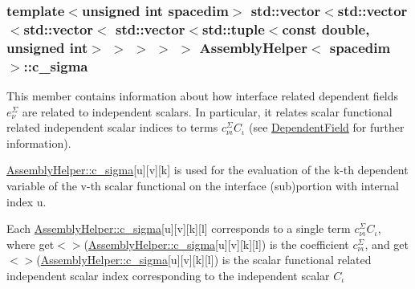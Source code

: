 \subsubsection[{\texorpdfstring{c\+\_\+sigma}{c_sigma}}]{\setlength{\rightskip}{0pt plus 5cm}template$<$unsigned int spacedim$>$ std\+::vector$<$std\+::vector$<$std\+::vector$<$ std\+::vector$<$std\+::tuple$<$const double, unsigned int$>$ $>$ $>$ $>$ $>$ {\bf Assembly\+Helper}$<$ spacedim $>$\+::c\+\_\+sigma\hspace{0.3cm}{\ttfamily [private]}}\hypertarget{class_assembly_helper_ab3d4370661ba726010ee687ef0e98140}{}\label{class_assembly_helper_ab3d4370661ba726010ee687ef0e98140}
This member contains information about how interface related dependent fields $e^\Sigma_\nu$ are related to independent scalars. In particular, it relates scalar functional related independent scalar indices to terms $c^\Sigma_{\nu\iota} C_\iota$ (see \hyperlink{class_dependent_field}{Dependent\+Field} for further information).

\hyperlink{class_assembly_helper_ab3d4370661ba726010ee687ef0e98140}{Assembly\+Helper\+::c\+\_\+sigma}\mbox{[}{\ttfamily u}\mbox{]}\mbox{[}{\ttfamily v}\mbox{]}\mbox{[}{\ttfamily k}\mbox{]} is used for the evaluation of the {\ttfamily k-\/th} dependent variable of the {\ttfamily v-\/th} scalar functional on the interface (sub)portion with internal index {\ttfamily u}.

Each \hyperlink{class_assembly_helper_ab3d4370661ba726010ee687ef0e98140}{Assembly\+Helper\+::c\+\_\+sigma}\mbox{[}{\ttfamily u}\mbox{]}\mbox{[}{\ttfamily v}\mbox{]}\mbox{[}{\ttfamily k}\mbox{]}\mbox{[}{\ttfamily l}\mbox{]} corresponds to a single term $c^\Sigma_{\nu\iota} C_\iota$, where {\ttfamily get$<${$>$}(\hyperlink{class_assembly_helper_ab3d4370661ba726010ee687ef0e98140}{Assembly\+Helper\+::c\+\_\+sigma}}\mbox{[}{\ttfamily u}\mbox{]}\mbox{[}{\ttfamily v}\mbox{]}\mbox{[}{\ttfamily k}\mbox{]}\mbox{[}{\ttfamily l}\mbox{]}) is the coefficient $c^\Sigma_{\nu\iota}$, and {\ttfamily get$<${$>$}(\hyperlink{class_assembly_helper_ab3d4370661ba726010ee687ef0e98140}{Assembly\+Helper\+::c\+\_\+sigma}}\mbox{[}{\ttfamily u}\mbox{]}\mbox{[}{\ttfamily v}\mbox{]}\mbox{[}{\ttfamily k}\mbox{]}\mbox{[}{\ttfamily l}\mbox{]}) is the scalar functional related independent scalar index corresponding to the independent scalar $C_\iota$ 
